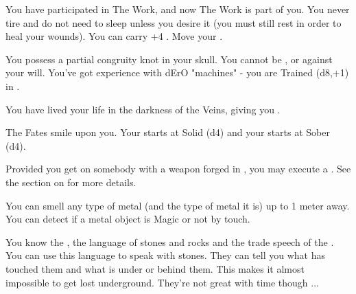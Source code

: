 \begin{multicols*}{2}
{{      \myskip

        You have participated in The Work, and now The Work is part of you.  You never tire and do not need to sleep unless you desire it (you must still rest in order to heal your wounds). You can carry +4 . Move your \TAL \DCUP.

      \myskip

        You possess a partial congruity knot in your skull.  You cannot be ,  or  against your will. You've got experience with dErO "machines" - you are Trained (d8,+1) in .

}}

\cbreak



  You have lived your life in the darkness of the Veins, giving you .



  The Fates smile upon you. Your \INJURY starts at Solid (d4) and your \INSANITY starts at Sober (d4). 



    Provided you get  on somebody with a weapon forged in , you may execute a . See the section on  for more details.


  You can smell any type of metal (and the type of metal it is) up to 1 meter away. You can detect if a metal object is Magic or not by touch.


  You know the , the language of stones and rocks and the trade speech of the .  You can use this language to speak with stones. They can tell you what has touched them and what is under or behind them.  This makes it almost impossible to get lost underground. They're not great with time though ...


\end{multicols*}
